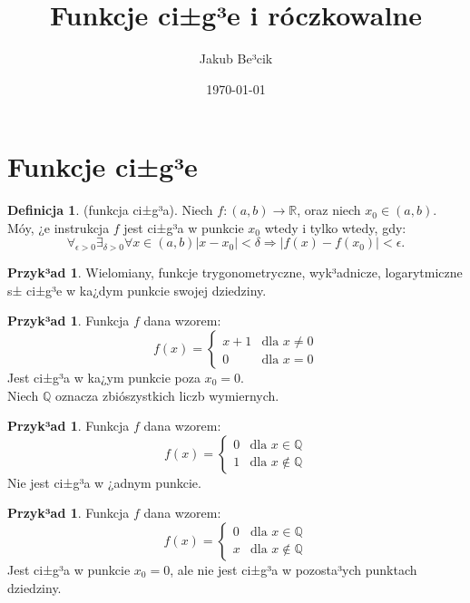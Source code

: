 \documentclass[12pt,a4paper]{article}
\title{Funkcje ci±g³e i róczkowalne}
\date{\today}
\author{Jakub Be³cik}
\theoremstyle{definition}
\newtheorem{df}[tw]{Definicja}
\newtheorem{ex}[tw]{Przyk³ad}
\begin{document}
\maketitle

\tableofcontents

\section{Funkcje ci±g³e}

\begin{df}
(funkcja ci±g³a). Niech $f: (a,b) \rightarrow \mathbb{R}$, oraz niech $x_0 \in (a,b)$. Móy, ¿e instrukcja $f$ jest ci±g³a w punkcie $x_0$ wtedy i tylko wtedy, gdy:
\[ \forall_{\epsilon >0}\exists_{\delta >0}\forall x \in (a,b) |x-x_0| < \delta  \Rightarrow  |f(x) - f(x_0)| < \epsilon .\]
\end{df}

\begin{ex}
Wielomiany, funkcje trygonometryczne, wyk³adnicze, logarytmiczne s± ci±g³e w ka¿dym punkcie swojej dziedziny.
\end{ex}

\begin{ex}
Funkcja $f$ dana wzorem:
\[ f (x) = \left\{ \begin{array}{ll} x + 1 & \mbox{dla } x \neq  0 \\ 0 & \mbox{dla } x = 0 \end{array} \right. \]
Jest ci±g³a w ka¿ym punkcie poza $x_0 = 0$.
\\ Niech $\mathbb{Q}$ oznacza zbiószystkich liczb wymiernych.
\end{ex}

\begin{ex}
Funkcja $f$ dana wzorem:
\[ f (x) = \left\{ \begin{array}{ll} 0 & \mbox{dla } x \in  \mathbb{Q} \\ 1 & \mbox{dla } x \notin  \mathbb{Q} \end{array} \right. \]
Nie jest ci±g³a w ¿adnym punkcie.
\end{ex}

\newpage

\begin{ex}
Funkcja $f$ dana wzorem:
\[ f (x) = \left\{ \begin{array}{ll} 0 & \mbox{dla } x \in  \mathbb{Q} \\ x & \mbox{dla } x \notin  \mathbb{Q} \end{array} \right. \]
Jest ci±g³a w punkcie $x_0 = 0$, ale nie jest ci±g³a w pozosta³ych punktach dziedziny.
\end{ex}
\end{document}
